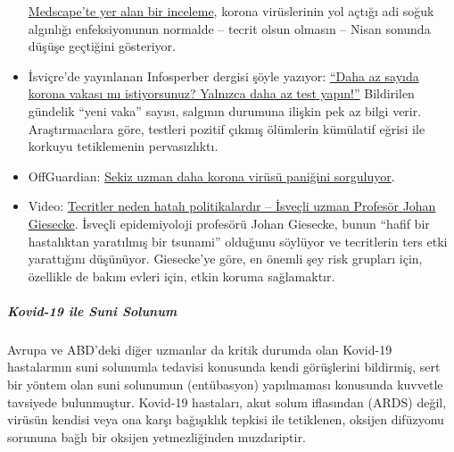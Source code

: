 \begin{itemize}
  \href{https://emedicine.medscape.com/article/227820-overview}{Medscape'te
  yer alan bir inceleme}, korona virüslerinin yol açtığı adi soğuk
  algınlığı enfeksiyonunun normalde -- tecrit olsun olmasın -- Nisan
  sonunda düşüşe geçtiğini gösteriyor.
\item
  İsviçre'de yayınlanan Infosperber dergisi şöyle yazıyor:
  \href{https://www.infosperber.ch/Artikel/Gesundheit/Weniger-Corona-Falle-Einfach-weniger-testen}{``Daha
  az sayıda korona vakası mı istiyorsunuz? Yalnızca daha az test
  yapın!''} Bildirilen gündelik ``yeni vaka'' sayısı, salgının durumuna
  ilişkin pek az bilgi verir. Araştırmacılara göre, testleri pozitif
  çıkmış ölümlerin kümülatif eğrisi ile korkuyu tetiklemenin
  pervasızlıktı.
\item
  OffGuardian:
  \href{https://off-guardian.org/2020/04/17/8-more-experts-questioning-the-coronavirus-panic/}{Sekiz
  uzman daha korona virüsü paniğini sorguluyor}.
\item
  Video: \href{https://www.youtube.com/watch?v=bfN2JWifLCY}{Tecritler
  neden hatalı politikalardır -- İsveçli uzman Profesör Johan Giesecke}.
  İsveçli epidemiyoloji profesörü Johan Giesecke, bunun ``hafif bir
  hastalıktan yaratılmış bir tsunami'' olduğunu söylüyor ve tecritlerin
  ters etki yarattığını düşünüyor. Giesecke'ye göre, en önemli şey risk
  grupları için, özellikle de bakım evleri için, etkin koruma
  sağlamaktır.
\end{itemize}

\hypertarget{kovid-19-ile-suni-solunum}{%
\subparagraph{\texorpdfstring{\textbf{Kovid-19 ile Suni
Solunum}}{Kovid-19 ile Suni Solunum}}\label{kovid-19-ile-suni-solunum}}

Avrupa ve ABD'deki diğer uzmanlar da kritik durumda olan Kovid-19
hastalarının suni solunumla tedavisi konusunda kendi görüşlerini
bildirmiş, sert bir yöntem olan suni solunumun (entübasyon) yapılmaması
konusunda kuvvetle tavsiyede bulunmuştur. Kovid-19 hastaları, akut solum
iflasından (ARDS) değil, virüsün kendisi veya ona karşı bağışıklık
tepkisi ile tetiklenen, oksijen difüzyonu sorununa bağlı bir oksijen
yetmezliğinden muzdariptir.

